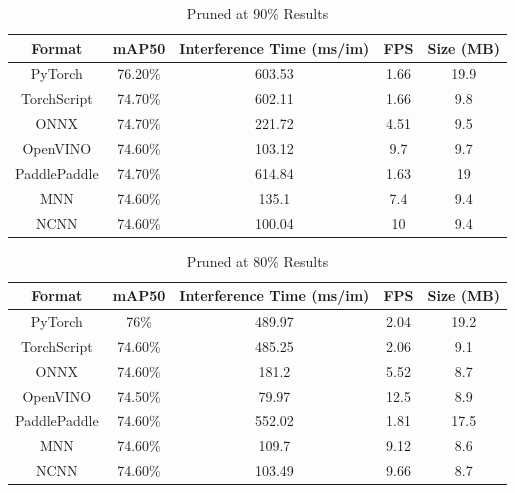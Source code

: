 \begin{table}[H]
    \centering
    \begin{tabular}{|c|c|c|c|c|}
        \hline
        \textbf{Format} & \textbf{mAP50} & \textbf{Interference Time (ms/im)} & \textbf{FPS} & \textbf{Size (MB)} \\
        \hline
        PyTorch & 76.20\% & 603.53 & 1.66 & 19.9 \\
        TorchScript & 74.70\% & 602.11 & 1.66 & 9.8 \\
        ONNX & 74.70\% & 221.72 & 4.51 & 9.5 \\
        OpenVINO & 74.60\% & 103.12 & 9.7 & 9.7 \\
        PaddlePaddle & 74.70\% & 614.84 & 1.63 & 19 \\
        MNN & 74.60\% & 135.1 & 7.4 & 9.4 \\
        NCNN & 74.60\% & 100.04 & 10 & 9.4 \\
        \hline
    \end{tabular}
    \caption{Pruned at 90\% Results}
    \label{tab:90res}
\end{table}

\begin{table}[H]
    \centering
    \begin{tabular}{|c|c|c|c|c|}
        \hline
        \textbf{Format} & \textbf{mAP50} & \textbf{Interference Time (ms/im)} & \textbf{FPS} & \textbf{Size (MB)} \\
        \hline
        PyTorch & 76\% & 489.97 & 2.04 & 19.2 \\
        TorchScript & 74.60\% & 485.25 & 2.06 & 9.1 \\
        ONNX & 74.60\% & 181.2 & 5.52 & 8.7 \\
        OpenVINO & 74.50\% & 79.97 & 12.5 & 8.9 \\
        PaddlePaddle & 74.60\% & 552.02 & 1.81 & 17.5 \\
        MNN & 74.60\% & 109.7 & 9.12 & 8.6 \\
        NCNN & 74.60\% & 103.49 & 9.66 & 8.7 \\
        \hline
    \end{tabular}
    \caption{Pruned at 80\% Results}
    \label{tab:80res}
\end{table}

